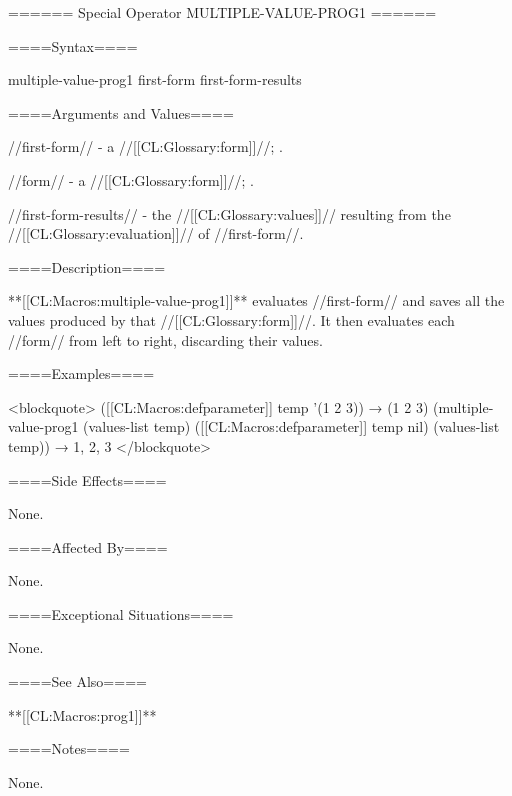 ====== Special Operator MULTIPLE-VALUE-PROG1 ======

====Syntax====

\DefspecWithValues multiple-value-prog1 {first-form } {first-form-results}

====Arguments and Values====

//first-form// - a //[[CL:Glossary:form]]//; \evalspecial.

//form// - a //[[CL:Glossary:form]]//; \evalspecial.

//first-form-results// - the //[[CL:Glossary:values]]// resulting from the //[[CL:Glossary:evaluation]]// of //first-form//.

====Description====

**[[CL:Macros:multiple-value-prog1]]** evaluates //first-form// and saves all the values produced by that //[[CL:Glossary:form]]//. It then evaluates each //form// from left to right, discarding their values.

====Examples====

<blockquote> ([[CL:Macros:defparameter]] temp '(1 2 3)) → (1 2 3) (multiple-value-prog1 (values-list temp) ([[CL:Macros:defparameter]] temp nil) (values-list temp)) → 1, 2, 3 </blockquote>

====Side Effects====

None.

====Affected By====

None.

====Exceptional Situations====

None.

====See Also====

**[[CL:Macros:prog1]]**

====Notes====

None.

